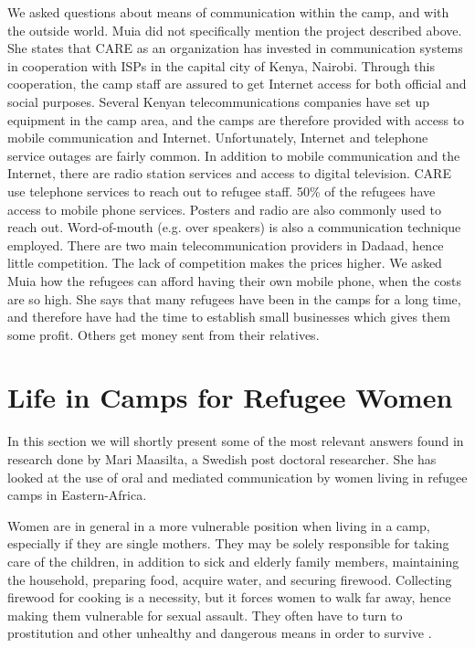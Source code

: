 We asked questions about means of communication within the camp, and with the outside world. Muia did not specifically mention the project described above. She states that CARE as an organization has invested in communication systems in cooperation with ISPs in the capital city of Kenya, Nairobi. Through this cooperation, the camp staff are assured to get Internet access for both official and social purposes. Several Kenyan telecommunications companies have set up equipment in the camp area, and the camps are therefore provided with access to mobile communication and Internet. Unfortunately, Internet and telephone service outages are fairly common. In addition to mobile communication and the Internet, there are radio station services and access to digital television. CARE use telephone services to reach out to refugee staff. 50\% of the refugees have access to mobile phone services. Posters and radio are also commonly used to reach out. Word-of-mouth (e.g. over speakers) is also a communication technique employed. There are two main telecommunication providers in Dadaad, hence little competition. The lack of competition makes the prices higher. We asked Muia how the refugees can afford having their own mobile phone, when the costs are so high. She says that many refugees have been in the camps for a long time, and therefore have had the time to establish small businesses which gives them some profit. Others get money sent from their relatives. 


\section{Life in Camps for Refugee Women}
In this section we will shortly present some of the most relevant answers found in research done by Mari Maasilta, a Swedish post doctoral researcher. She has looked at the use of oral and mediated communication by women living in refugee camps in Eastern-Africa. 

Women are in general in a more vulnerable position when living in a  camp, especially if they are single mothers. They may be solely responsible for taking care of the children, in addition to sick and elderly family members, maintaining the household, preparing food, acquire water, and securing firewood. Collecting firewood for cooking is a necessity, but it forces women  to walk far away, hence making them vulnerable for sexual assault. They often have to turn to prostitution and other unhealthy and dangerous means in order to survive \cite{womenRefugee}. 

